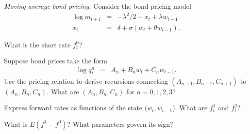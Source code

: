 \documentclass[11pt]{exam}
\begin{document}
\begin{questions}
\item {\it Moving average bond pricing.\/}
Consider the bond pricing model
\begin{eqnarray*}
    \log m_{t+1} &=& - \lambda^2/2 - x_t + \lambda w_{t+1} \\
    x_t &=& \delta + \sigma (w_t + \theta w_{t-1}) .
\end{eqnarray*}

\begin{parts}
\item What is the short rate $f^0_t$?
\item Suppose bond prices take the form
\begin{eqnarray*}
    \log q^n_{t} &=& A_n + B_n w_t + C_n w_{t-1} .
\end{eqnarray*}
Use the pricing relation to derive recursions connecting
$(A_{n+1}, B_{n+1}, C_{n+1})$ to $(A_{n}, B_{n}, C_{n})$.
What are $(A_{n}, B_{n}, C_{n})$ for $n=0,1,2,3$?
\item Express forward rates as functions of the state $(w_t,w_{t-1}$).
What are $f^1_t$ and $f^2_t$?
\item What is $E(f^1- f^0)$?  What parameters govern its sign?
\end{parts}


\end{questions}
\end{document}
